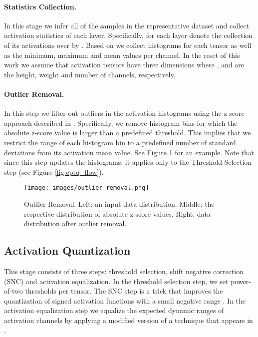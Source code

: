 \documentclass{article}
\begin{document}
\paragraph{Statistics Collection.}
In this stage we infer all of the samples in the representative dataset  and collect activation statistics of each layer. Specifically, for each layer  denote the collection of its activations over  by .
Based on  we collect histograms for each tensor as well as the minimum, maximum and mean values per channel. In the reset of this work we assume that activation tensors   have three dimensions where ,  and  are the height, weight and number of channels, respectively.

\paragraph{Outlier Removal.}
In this step we filter out outliers in the activation histograms using the z-score approach described in \cite{aggarwal2015outlier}. 
Specifically, we remove histogram bins for which the absolute z-score value is larger than a predefined threshold. This implies that we restrict the range of each histogram bin to a predefined number of standard deviations from its activation mean value. 
See Figure \ref{fig:z_score} for an example.
Note that since this step updates the histograms, it applies only to the Threshold Selection step (see Figure \ref{fig:cptq_flow}).



\begin{figure}[H]
     \centering
     \texttt{[image: images/outlier\_removal.png]}
     \caption{Outlier Removal. Left: an input data distribution. Middle: the respective distribution of absolute z-score values. Right: data distribution after outlier removal.}
     \label{fig:z_score}
\end{figure}
 

\subsection{Activation Quantization}
This stage consists of three steps: threshold selection, shift negative correction (SNC) and activation equalization.  
In the threshold selection step, we set power-of-two thresholds per tensor. The SNC step is a trick that improves the quantization of signed activation functions with a small negative range \cite{bhalgat2020lsq+}. 
In the activation equalization step we equalize the expected dynamic ranges of activation channels by applying a modified version of a technique that appears in \cite{nagel2019data}. 
\end{document}
